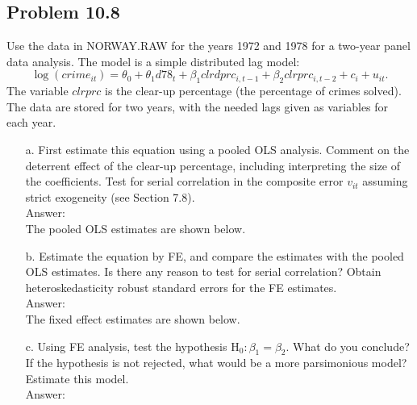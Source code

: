 \documentclass[10pt]{article}
\newcommand{\Hy}{\text{H}}
\begin{document}
\subsection*{Problem 10.8}
Use the data in NORWAY.RAW for the years 1972 and 1978 for a two-year panel data analysis. The model is a simple distributed lag model:
\[\log(crime_{it})=\theta_0+\theta_1d78_t+\beta_1clrdprc_{i,t-1}+\beta_2clrprc_{i,t-2}+c_i+u_{it}.\]
The variable $clrprc$ is the clear-up percentage (the percentage of crimes solved). The data are stored for two years, with the needed lags given as variables for each year. 
\begin{enumerate}
\item[a.] First estimate this equation using a pooled OLS analysis. Comment on the deterrent effect of the clear-up percentage, including interpreting the size of the coefficients. Test for serial correlation in the composite error $v_{it}$ assuming strict exogeneity (see Section 7.8). 
\\ Answer: \\
The pooled OLS estimates are shown below.

\item[b.] Estimate the equation by FE, and compare the estimates with the pooled OLS estimates. Is there any reason to test for serial correlation? Obtain heteroskedasticity robust standard errors for the FE estimates. 
\\ Answer: \\
The fixed effect estimates are shown below.

\item[c.] Using FE analysis, test the hypothesis $\Hy_0:\beta_1=\beta_2$. What do you conclude? If the hypothesis is not rejected, what would be a more parsimonious model? Estimate this model.
\\ Answer: \\ \\
\end{enumerate}
\end{document}
